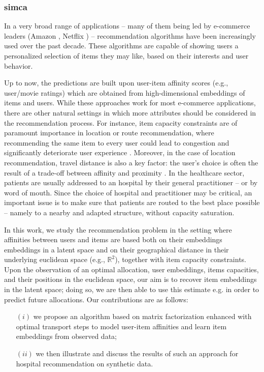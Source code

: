 \subsubsection{\acl{simca}}

In a very broad range of applications -- many of them being led by e-commerce
leaders (Amazon \cite{linden_amazoncom_2003}, Netflix \cite{koren_matrix_2009})
-- recommendation algorithms have been increasingly used over the past decade.
These algorithms are capable of showing users a personalized selection of items
they may like, based on their interests and user behavior.

Up to now, the predictions are built upon user-item affinity scores (e.g.,
user/movie ratings) which are obtained from high-dimensional embeddings of items
and users. While these approaches work for most e-commerce applications, there
are other natural settings in which more attributes should be considered in the
recommendation process. For instance, item capacity constraints are of paramount
importance in location or route recommendation, where recommending the same item
to every user could lead to congestion and significantly deteriorate  user
experience \cite{christakopoulou_recommendation_2017}. Moreover, in the case of
location recommendation, travel distance is also a key factor: the user's choice
is often the result of a trade-off between affinity and proximity
\cite{zhao_survey_2016}. In the healthcare sector, patients are usually
addressed to an hospital by their general practitioner -- or by word of mouth.
Since the choice of hospital and practitioner may be critical, an important
issue is to make sure that patients are routed to the best place possible --
namely to a nearby and adapted structure, without capacity saturation.

In this work, we study the recommendation problem in the setting where
affinities between users and items are based both on their embeddings embeddings
in a latent space and on their geographical distance in their underlying
euclidean space (e.g., $\mathbb{R}^2$), together with item capacity constraints.
Upon the observation of an optimal allocation, user embeddings, items
capacities, and their positions in the euclidean space, our aim is to recover
item embeddings in the latent space; doing so, we are then able to use this
estimate e.g. in order to predict future allocations. Our contributions are as
follows:

\begin{itemize}
    \item[$(i)$] we propose an algorithm based on matrix factorization enhanced
        with optimal transport steps to model user-item affinities and learn item
        embeddings from observed data;
    \item[$(ii)$] we then illustrate and discuss the results of such an approach
        for hospital recommendation on synthetic data.
\end{itemize}

